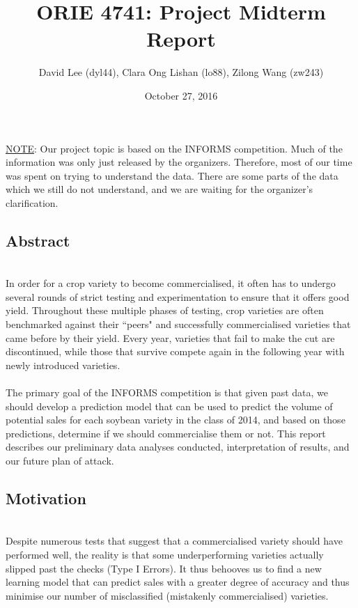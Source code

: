 \documentclass[psamsfonts]{amsart}
\title{ORIE 4741: Project Midterm Report}
\author{David Lee (dyl44), Clara Ong Lishan (lo88), Zilong Wang (zw243)}
\date{October 27, 2016}
\begin{document}
\maketitle

\underline{NOTE}: Our project topic is based on the INFORMS competition. Much of the information was only just released by the organizers. Therefore, most of our time was spent on trying to understand the data. There are some parts of the data which we still do not understand, and we are waiting for the organizer's clarification. 

\subsection*{Abstract}
\hfill \\

In order for a crop variety to become commercialised, it often has to undergo several rounds of strict testing and experimentation to ensure that it offers good yield. Throughout these multiple phases of testing, crop varieties are often benchmarked against their ``peers" and successfully commercialised varieties that came before by their yield. Every year, varieties that fail to make the cut are discontinued, while those that survive compete again in the following year with newly introduced varieties.\\
\\
 The primary goal of the INFORMS competition is that given past data, we should develop a prediction model that can be used to predict the volume of potential sales for each soybean variety in the class of 2014, and based on those predictions, determine if we should commercialise them or not. This report describes our preliminary data analyses conducted, interpretation of results, and our future plan of attack. \\


\subsection*{Motivation}
\hfill \\

 Despite numerous tests that suggest that a commercialised variety should have performed well, the reality is that some underperforming varieties actually slipped past the checks (Type I Errors). It thus behooves us to find a new learning model that can predict sales with a greater degree of accuracy and thus minimise our number of misclassified (mistakenly commercialised) varieties.\\
\end{document}
